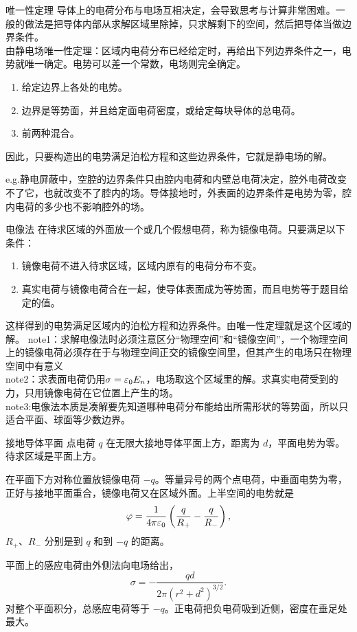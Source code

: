 \begin{frame}{唯一性定理}
导体上的电荷分布与电场互相决定，会导致思考与计算非常困难。一般的做法是把导体内部从求解区域里除掉，只求解剩下的空间，然后把导体当做边界条件。\\
由静电场唯一性定理：区域内电荷分布已经给定时，再给出下列边界条件之一，电势就唯一确定。电势可以差一个常数，电场则完全确定。
\begin{enumerate}
\item 给定边界上各处的电势。
\item 边界是等势面，并且给定面电荷密度，或给定每块导体的总电荷。
\item 前两种混合。
\end{enumerate}
因此，只要构造出的电势满足泊松方程和这些边界条件，它就是静电场的解。

e.g.静电屏蔽中，空腔的边界条件只由腔内电荷和内壁总电荷决定，腔外电荷改变不了它，也就改变不了腔内的场。导体接地时，外表面的边界条件是电势为零，腔内电荷的多少也不影响腔外的场。
\end{frame}

\begin{frame}{电像法}
在待求区域的外面放一个或几个假想电荷，称为镜像电荷。只要满足以下条件：
\begin{enumerate}
\item 镜像电荷不进入待求区域，区域内原有的电荷分布不变。
\item 真实电荷与镜像电荷合在一起，使导体表面成为等势面，而且电势等于题目给定的值。
\end{enumerate}
这样得到的电势满足区域内的泊松方程和边界条件。由唯一性定理就是这个区域的解。
note1：求解电像法时必须注意区分“物理空间”和“镜像空间”，一个物理空间上的镜像电荷必须存在于与物理空间正交的镜像空间里，但其产生的电场只在物理空间中有意义\\
note2：求表面电荷仍用$\sigma=\varepsilon_0 E_n$，电场取这个区域里的解。求真实电荷受到的力，只用镜像电荷在它位置上产生的场。\\
note3:电像法本质是凑解要先知道哪种电荷分布能给出所需形状的等势面，所以只适合平面、球面等少数边界。
\end{frame}

\begin{frame}{接地导体平面}
点电荷 $q$ 在无限大接地导体平面上方，距离为 $d$，平面电势为零。待求区域是平面上方。

在平面下方对称位置放镜像电荷 $-q$。等量异号的两个点电荷，中垂面电势为零，正好与接地平面重合，镜像电荷又在区域外面。上半空间的电势就是
\[
 \varphi=\frac{1}{4\pi\varepsilon_0}\left(
 \frac{q}{R_+}-\frac{q}{R_-}\right),
\]
$R_+$、$R_-$ 分别是到 $q$ 和到 $-q$ 的距离。

平面上的感应电荷由外侧法向电场给出，
\[
 \sigma=-\frac{qd}{2\pi(r^2+d^2)^{3/2}}.
\]
对整个平面积分，总感应电荷等于 $-q$。正电荷把负电荷吸到近侧，密度在垂足处最大。
\end{frame}

